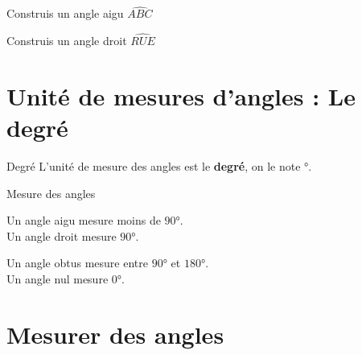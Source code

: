 \begin{pageAD}
 

\begin{minipage}{0.5\linewidth}
Construis un angle aigu $\widehat{ABC}$
\end{minipage}
\begin{minipage}{0.5\linewidth}
Construis un angle droit $\widehat{RUE}$
\end{minipage}

 
\end{pageAD}

\begin{pageCours}
\section{Unité de mesures d'angles : Le degré}

\begin{DefT}{Degré}
L'unité de mesure des angles est le \textbf{degré}, on le note °.
\end{DefT}

 

\begin{DefT}{Mesure des angles}
\begin{minipage}{0.5\linewidth}
 Un angle aigu  mesure moins de $90$°.\\
 Un angle droit  mesure $90$°.

\end{minipage}
\begin{minipage}{0.5\linewidth}
Un angle obtus mesure entre $90$° et $180$°.\\
Un angle nul mesure $0$°.
\end{minipage}
\end{DefT}
 

\section{Mesurer des angles}


\end{pageCours}
